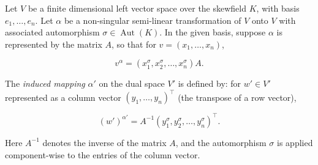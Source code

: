 Let $V$ be a finite dimensional left vector space over the skewfield $K$, with basis $e_1, \dots, e_n$. Let $\alpha$ be a non-singular semi-linear transformation of $V$ onto $V$ with associated automorphism $\sigma \in \operatorname{Aut}(K)$. In the given basis, suppose $\alpha$ is represented by the matrix $A$, so that for $v = (x_1, \dots, x_n)$,

$$v^\alpha = (x_1^\sigma, x_2^\sigma, \dots, x_n^\sigma) A.$$

The \textit{induced mapping} $\alpha'$ on the dual space $V'$ is defined by: for $w' \in V'$ represented as a column vector $(y_1, \dots, y_n)^\top$ (the transpose of a row vector),

$$(w')^{\alpha'} = A^{-1} (y_1^\sigma, y_2^\sigma, \dots, y_n^\sigma)^\top.$$

Here $A^{-1}$ denotes the inverse of the matrix $A$, and the automorphism $\sigma$ is applied component-wise to the entries of the column vector.

